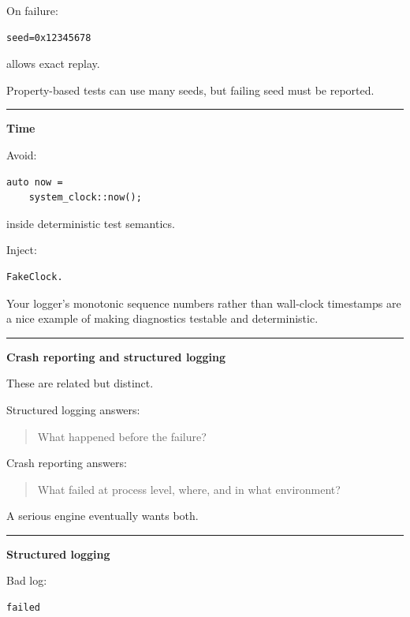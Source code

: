 On failure:

\begin{verbatim}
seed=0x12345678
\end{verbatim}

allows exact replay.

Property-based tests can use many seeds, but failing seed must be reported.

\begin{center}\rule{0.5\linewidth}{0.5pt}\end{center}

\textbf{Time}

Avoid:

\begin{verbatim}
auto now =
    system_clock::now();
\end{verbatim}

inside deterministic test semantics.

Inject:

\begin{verbatim}
FakeClock.
\end{verbatim}

Your logger's monotonic sequence numbers rather than wall-clock timestamps are a nice example of making diagnostics testable and deterministic.

\begin{center}\rule{0.5\linewidth}{0.5pt}\end{center}

\textbf{Crash reporting and structured logging}

These are related but distinct.

Structured logging answers:

\begin{quote}
What happened before the failure?
\end{quote}

Crash reporting answers:

\begin{quote}
What failed at process level, where, and in what environment?
\end{quote}

A serious engine eventually wants both.

\begin{center}\rule{0.5\linewidth}{0.5pt}\end{center}

\textbf{Structured logging}

Bad log:

\begin{verbatim}
failed
\end{verbatim}

